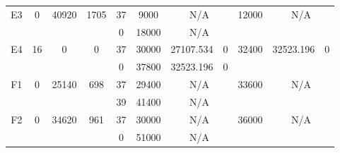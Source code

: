 \begin{sidewaystable}
\begin{tabular}{c||c|c|c||c|c|c|c||c|c|c}
         &
        
      \\
      \hline
      \multirow{2}{*}{E3} &
      \multirow{2}{*}{0} &
      \multirow{2}{*}{40920} &
      \multirow{2}{*}{1705} &
      37 &
      9000 &
        \multicolumn{2}{|c||}{N/A} &
      \multirow{2}{*}{12000} &
        \multicolumn{2}{c}{\multirow{2}{*}{N/A}}
      \\
      \cline{5-8}
       &
       &
       &
       &
      0 &
      18000 &
        \multicolumn{2}{|c||}{N/A} &
      
        
      \\
      \hline
      \multirow{2}{*}{E4} &
      \multirow{2}{*}{16} &
      \multirow{2}{*}{0} &
      \multirow{2}{*}{0} &
      37 &
      30000 &
        27107.534 &
        0 &
      \multirow{2}{*}{32400} &
        \multirow{2}{*}{32523.196} &
        \multirow{2}{*}{0}
      \\
      \cline{5-8}
       &
       &
       &
       &
      0 &
      37800 &
        32523.196 &
        0 &
      
         &
        
      \\
      \hline
      \multirow{2}{*}{F1} &
      \multirow{2}{*}{0} &
      \multirow{2}{*}{25140} &
      \multirow{2}{*}{698} &
      37 &
      29400 &
        \multicolumn{2}{|c||}{N/A} &
      \multirow{2}{*}{33600} &
        \multicolumn{2}{c}{\multirow{2}{*}{N/A}}
      \\
      \cline{5-8}
       &
       &
       &
       &
      39 &
      41400 &
        \multicolumn{2}{|c||}{N/A} &
      
        
      \\
      \hline
      \multirow{2}{*}{F2} &
      \multirow{2}{*}{0} &
      \multirow{2}{*}{34620} &
      \multirow{2}{*}{961} &
      37 &
      30000 &
        \multicolumn{2}{|c||}{N/A} &
      \multirow{2}{*}{36000} &
        \multicolumn{2}{c}{\multirow{2}{*}{N/A}}
      \\
      \cline{5-8}
       &
       &
       &
       &
      0 &
      51000 &
        \multicolumn{2}{|c||}{N/A} &
      
        
      \\
\end{tabular}
\label{table:RASDATASET2} 
\end{sidewaystable}
